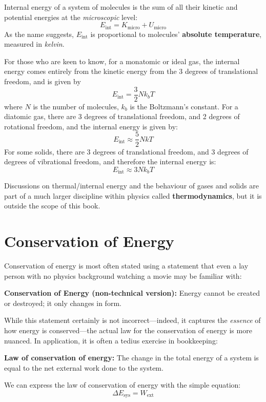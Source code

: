 Internal energy of a system of molecules is the sum of all their kinetic and
potential energies at the \emph{microscopic} level:
\begin{equation}
  \boxed{
    E_\text{int}=K_\text{micro} + U_\text{micro}
  }
\end{equation}
As the name suggests, $E_\text{int}$ is proportional to molecules'
\textbf{absolute temperature}, measured in \emph{kelvin}.
\begin{remark}
  For those who are keen to know, for a monatomic or ideal gas, the internal
  energy comes entirely from the kinetic energy from the 3 degrees of
  translational freedom, and is given by
  \begin{equation*}
    E_\text{int}=\dfrac32Nk_bT
  \end{equation*}
  where $N$ is the number of molecules, $k_b$ is the Boltzmann's constant.
  For a diatomic gas, there are 3 degrees of translational freedom, and 2
  degrees of rotational freedom, and the internal energy is given by:
  \begin{equation*}
    E_\text{int}\approx\dfrac52NkT
  \end{equation*}
  For some solids, there are 3 degrees of translational freedom, and 3 degrees
  of degrees of vibrational freedom, and therefore the internal energy is:
  \begin{equation*}
    E_\text{int}\approx3Nk_bT
  \end{equation*}
\end{remark}%
Discussions on thermal/internal energy and the behaviour of gases and solids
are part of a much larger discipline within physics called
\textbf{thermodynamics}, but it is outside the scope of this book.



\section{Conservation of Energy}
Conservation of energy is most often stated using a statement that even a lay
person with no physics background watching a movie may be familiar with:
\begin{definition}
  \textbf{Conservation of Energy (non-technical version):} Energy cannot
  be created or destroyed; it only changes in form.
\end{definition}
While this statement certainly is not incorrect---indeed, it captures the
\emph{essence} of how energy is conserved---the actual law for the conservation
of energy is more nuanced. In application, it is often a tedius exercise in
bookkeeping:
\begin{definition}
  \textbf{Law of conservation of energy:} The change in the total energy
  of a system is equal to the net external work done to the system.
\end{definition}
We can express the law of conservation of energy with the simple equation:
\begin{equation}
  \boxed{
    \Delta E_\text{sys}=W_\text{ext}
  }
  \label{eq:energy-conservation-law}
\end{equation}



